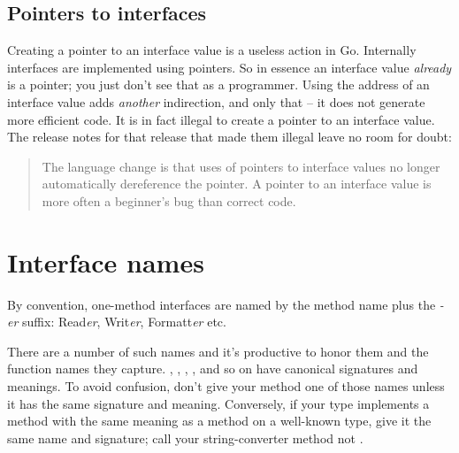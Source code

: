 \subsection{Pointers to interfaces}
Creating a pointer to an interface value is a useless action in Go.
Internally interfaces are implemented using pointers. So in
essence an interface value \emph{already} is a pointer; you just don't see that
as a programmer. Using the address of an interface value adds \emph{another}
indirection, and only that -- it does not generate more efficient code.
 It is in fact illegal to
create a pointer to an interface value. The release notes for that release that
made them illegal leave no room for doubt:
\begin{quote}
The language change is that uses of pointers to interface values no longer 
automatically dereference the pointer.  A pointer to an interface value is more 
often a beginner's bug than correct code.
\end{quote}

\section{Interface names}
By convention, one-method interfaces are named by the method name plus
the \emph{-er} suffix: Read\emph{er}, Writ\emph{er}, Formatt\emph{er} etc.

There are a number of such names and it's productive to honor them and
the function names they capture. , ,
, ,  and
so on have canonical signatures and meanings. To avoid confusion, don't
give your method one of those names unless it has the same signature and
meaning. Conversely, if your type implements a method with the same
meaning as a method on a well-known type, give it the same name and
signature; call your string-converter method  not
.


